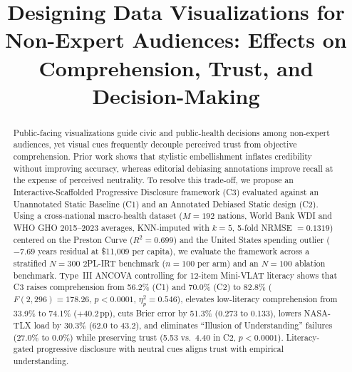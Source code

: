 \documentclass[conference]{IEEEtran}
\newcommand{\etap}{\eta_p^{2}}
\newcommand{\WdiM}{192}
\newcommand{\WdiKnnNrmse}{0.1319}
\newcommand{\PrestonRsq}{0.699}
\newcommand{\UsaChexPc}{\$11,009}
\newcommand{\UsaLeResid}{-7.69}
\begin{document}
\title{Designing Data Visualizations for Non-Expert Audiences: Effects on Comprehension, Trust, and Decision-Making}

\author{%
\and
{}
}

\maketitle

\begin{abstract}
Public-facing visualizations guide civic and public-health decisions among non-expert audiences, yet visual cues frequently decouple perceived trust from objective comprehension. Prior work shows that stylistic embellishment inflates credibility without improving accuracy, whereas editorial debiasing annotations improve recall at the expense of perceived neutrality. To resolve this trade-off, we propose an Interactive-Scaffolded Progressive Disclosure framework (C3) evaluated against an Unannotated Static Baseline (C1) and an Annotated Debiased Static design (C2). Using a cross-national macro-health dataset ($M = \WdiM$ nations, World Bank WDI and WHO GHO 2015--2023 averages, KNN-imputed with $k = 5$, 5-fold NRMSE $= \WdiKnnNrmse$) centered on the Preston Curve ($R^2 = \PrestonRsq$) and the United States spending outlier ($\UsaLeResid$ years residual at \UsaChexPc{} per capita), we evaluate the framework across a stratified $N = 300$ 2PL-IRT benchmark ($n = 100$ per arm) and an $N = 100$ ablation benchmark. Type~III ANCOVA controlling for 12-item Mini-VLAT literacy shows that C3 raises comprehension from 56.2\% (C1) and 70.0\% (C2) to 82.8\% ($F(2,296) = 178.26$, $p < 0.0001$, $\etap = 0.546$), elevates low-literacy comprehension from 33.9\% to 74.1\% ($+40.2$\,pp), cuts Brier error by 51.3\% (0.273 to 0.133), lowers NASA-TLX load by 30.3\% (62.0 to 43.2), and eliminates ``Illusion of Understanding'' failures (27.0\% to 0.0\%) while preserving trust (5.53 vs.\ 4.40 in C2, $p < 0.0001$). Literacy-gated progressive disclosure with neutral cues aligns trust with empirical understanding.
\end{abstract}
\end{document}
